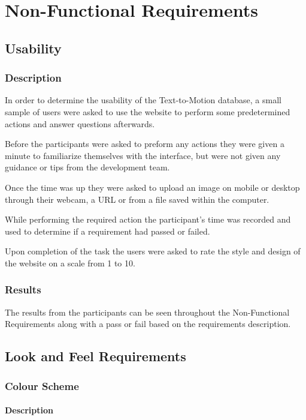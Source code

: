 \documentclass{scrreprt}
\begin{document}
\chapter{Non-Functional Requirements}
\section{Usability}
\subsection{Description}
In order to determine the usability of the Text-to-Motion database, a small
sample of users were asked to use the website to perform some predetermined
actions and answer questions afterwards.

Before the participants were asked to preform any actions they were given a
minute to familiarize themselves with the interface, but were not given any
guidance or tips from the development team.

Once the time was up they were asked to upload an image on mobile or desktop
through their webcam, a URL or from a file saved within the computer.

While performing the required action the participant's time was recorded and
used to determine if a requirement had passed or failed.

Upon completion of the task the users were asked to rate the style and design
of the website on a scale from 1 to 10.

\subsection{Results}

The results from the participants can be seen throughout the Non-Functional
Requirements along with a pass or fail based on the requirements description.

\section{Look and Feel Requirements}
\subsection{Colour Scheme}
\subsubsection{Description}
\end{document}
